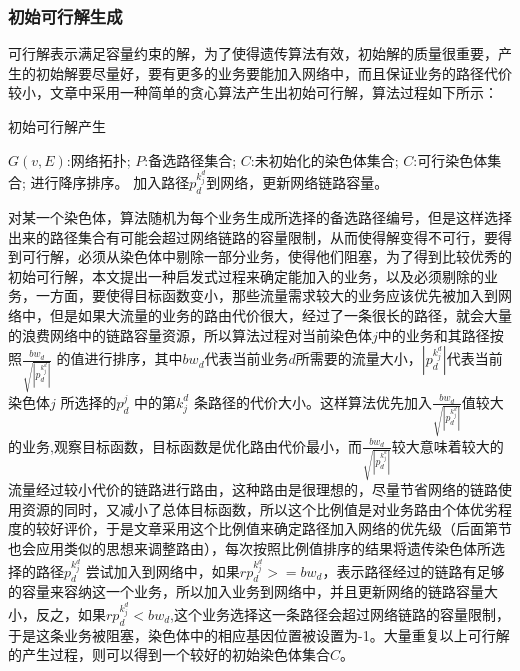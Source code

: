 \subsubsection{初始可行解生成}
可行解表示满足容量约束的解，为了使得遗传算法有效，初始解的质量很重要，产生的初始解要尽量好，要有更多的业务要能加入网络中，而且保证业务的路径代价较小，文章中采用一种简单的贪心算法产生出初始可行解，算法过程如下所示：
\begin{algorithm}[htb]
\caption{初始可行解产生}
\label{alg:Framwork}
\begin{algorithmic}[1]
\Require
$G(v,E)$:网络拓扑;
$P$:备选路径集合;
$C$:未初始化的染色体集合;
\Ensure
$C$:可行染色体集合;
\EndFor
\EndFor
{}
\EndFor
{}进行降序排序。
\State 加入路径$p^{k^d_j}_d$到网络，更新网络链路容量。
\Else
{}
\EndIf
\EndFor
\EndFor
\end{algorithmic}
\end{algorithm}
  对某一个染色体，算法随机为每个业务生成所选择的备选路径编号，但是这样选择出来的路径集合有可能会超过网络链路的容量限制，从而使得解变得不可行，要得到可行解，必须从染色体中剔除一部分业务，使得他们阻塞，为了得到比较优秀的初始可行解，本文提出一种启发式过程来确定能加入的业务，以及必须剔除的业务，一方面，要使得目标函数变小，那些流量需求较大的业务应该优先被加入到网络中，但是如果大流量的业务的路由代价很大，经过了一条很长的路径，就会大量的浪费网络中的链路容量资源，所以算法过程对当前染色体$j$中的业务和其路径按照$\frac{bw_d}{\sqrt{|p^{k^d_j}_d|}}$ 的值进行排序，其中${bw_d}$代表当前业务$d$所需要的流量大小，$|p^{k^d_j}_d|$代表当前染色体$j$ 所选择的$p^j_d$ 中的第${k^d_j}$ 条路径的代价大小。这样算法优先加入$\frac{bw_d}{\sqrt{|p^{k^d_j}_d|}}$值较大的业务,观察目标函数，目标函数是优化路由代价最小，而$\frac{bw_d}{\sqrt{|p^{k^d_j}_d|}}$较大意味着较大的流量经过较小代价的链路进行路由，这种路由是很理想的，尽量节省网络的链路使用资源的同时，又减小了总体目标函数，所以这个比例值是对业务路由个体优劣程度的较好评价，于是文章采用这个比例值来确定路径加入网络的优先级（后面第节也会应用类似的思想来调整路由），每次按照比例值排序的结果将遗传染色体所选择的路径$p^{k^d_j}_d$ 尝试加入到网络中，如果$rp^{k^d_j}_d>=bw_d$，表示路径经过的链路有足够的容量来容纳这一个业务，所以加入业务到网络中，并且更新网络的链路容量大小，反之，如果$rp^{k^d_j}_d<bw_d$,这个业务选择这一条路径会超过网络链路的容量限制，于是这条业务被阻塞，染色体中的相应基因位置被设置为-1。大量重复以上可行解的产生过程，则可以得到一个较好的初始染色体集合$C$。
